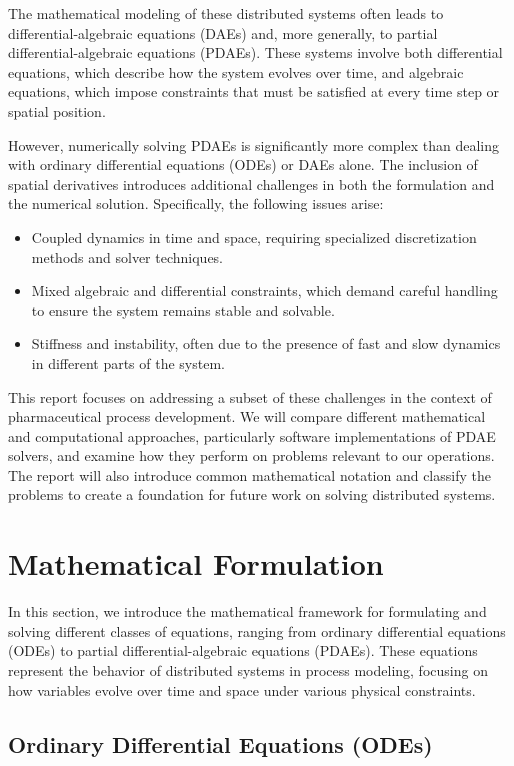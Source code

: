 \documentclass{article}
\begin{document}
The mathematical modeling of these distributed systems often leads to differential-algebraic equations (DAEs) and, more generally, to partial differential-algebraic equations (PDAEs). These systems involve both differential equations, which describe how the system evolves over time, and algebraic equations, which impose constraints that must be satisfied at every time step or spatial position.

However, numerically solving PDAEs is significantly more complex than dealing with ordinary differential equations (ODEs) or DAEs alone. The inclusion of spatial derivatives introduces additional challenges in both the formulation and the numerical solution. Specifically, the following issues arise:
\begin{itemize}
    \item Coupled dynamics in time and space, requiring specialized discretization methods and solver techniques.
    \item Mixed algebraic and differential constraints, which demand careful handling to ensure the system remains stable and solvable.
    \item Stiffness and instability, often due to the presence of fast and slow dynamics in different parts of the system.
\end{itemize}

This report focuses on addressing a subset of these challenges in the context of pharmaceutical process development. We will compare different mathematical and computational approaches, particularly software implementations of PDAE solvers, and examine how they perform on problems relevant to our operations. The report will also introduce common mathematical notation and classify the problems to create a foundation for future work on solving distributed systems.

\section{Mathematical Formulation}

In this section, we introduce the mathematical framework for formulating and solving different classes of equations, ranging from ordinary differential equations (ODEs) to partial differential-algebraic equations (PDAEs). These equations represent the behavior of distributed systems in process modeling, focusing on how variables evolve over time and space under various physical constraints.

\subsection{Ordinary Differential Equations (ODEs)}
\end{document}
